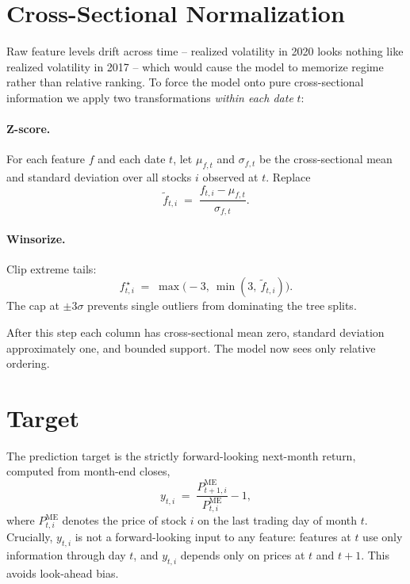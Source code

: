 \documentclass[11pt]{article}
\begin{document}
\section{Cross-Sectional Normalization}
\label{sec:norm}
Raw feature levels drift across time -- realized volatility in 2020 looks nothing like
realized volatility in 2017 -- which would cause the model to memorize regime rather than
relative ranking. To force the model onto pure cross-sectional information we apply two
transformations \emph{within each date} $t$:

\paragraph{Z-score.} For each feature $f$ and each date $t$, let $\mu_{f,t}$ and
$\sigma_{f,t}$ be the cross-sectional mean and standard deviation over all stocks $i$
observed at $t$. Replace
\begin{equation}
\tilde{f}_{t,i} \;=\; \frac{f_{t,i} - \mu_{f,t}}{\sigma_{f,t}}.
\end{equation}

\paragraph{Winsorize.} Clip extreme tails:
\begin{equation}
f^{\,\star}_{t,i} \;=\; \max\!\big(-3,\ \min(3,\ \tilde{f}_{t,i})\big).
\end{equation}
The cap at $\pm 3\sigma$ prevents single outliers from dominating the tree splits.

After this step each column has cross-sectional mean zero, standard deviation
approximately one, and bounded support. The model now sees only relative ordering.

\section{Target}
\label{sec:target}
The prediction target is the strictly forward-looking next-month return, computed
from month-end closes,
\begin{equation}
y_{t,i} \;=\; \frac{P^{\text{ME}}_{t+1,i}}{P^{\text{ME}}_{t,i}} - 1,
\end{equation}
where $P^{\text{ME}}_{t,i}$ denotes the price of stock $i$ on the last trading day of
month $t$. Crucially, $y_{t,i}$ is not a forward-looking input to any feature: features
at $t$ use only information through day $t$, and $y_{t,i}$ depends only on prices at
$t$ and $t+1$. This avoids look-ahead bias.
\end{document}
